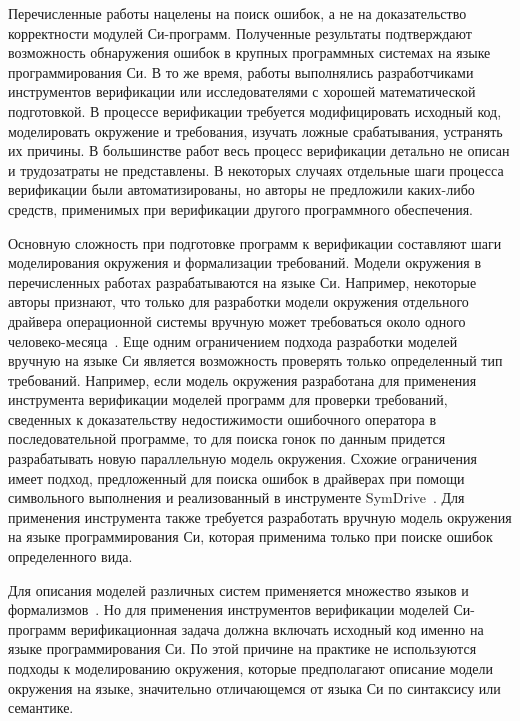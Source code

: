 Перечисленные работы нацелены на поиск ошибок, а не на доказательство корректности модулей Си-программ.
Полученные результаты подтверждают возможность обнаружения ошибок в крупных программных системах на языке программирования Си.
В то же время, работы выполнялись разработчиками инструментов верификации или исследователями с хорошей математической подготовкой.
В процессе верификации требуется модифицировать исходный код, моделировать окружение и требования, изучать ложные срабатывания, устранять их причины.
В большинстве работ весь процесс верификации детально не описан и трудозатраты не представлены.
В некоторых случаях отдельные шаги процесса верификации были автоматизированы, но авторы не предложили каких-либо средств, применимых при верификации другого программного обеспечения.

Основную сложность при подготовке программ к верификации составляют шаги моделирования окружения и формализации требований.
Модели окружения в перечисленных работах разрабатываются на языке Си.
Например, некоторые авторы признают, что только для разработки модели окружения отдельного драйвера операционной системы вручную может требоваться около одного человеко-месяца~\cite{ConcurBugsRakamaric}.
Еще одним ограничением подхода разработки моделей вручную на языке Си является возможность проверять только определенный тип требований.
Например, если модель окружения разработана для применения инструмента верификации моделей программ для проверки требований, сведенных к доказательству недостижимости ошибочного оператора в последовательной программе, то для поиска гонок по данным придется разрабатывать новую параллельную модель окружения.
Схожие ограничения имеет подход, предложенный для поиска ошибок в драйверах при помощи символьного выполнения и реализованный в инструменте SymDrive~\cite{Renzelmann:2012:STD}.
Для применения инструмента также требуется разработать вручную модель окружения на языке программирования Си, которая применима только при поиске ошибок определенного вида.

Для описания моделей различных систем применяется множество языков и формализмов~\cite{Seshia2018}.
Но для применения инструментов верификации моделей Си-программ верификационная задача должна включать исходный код именно на языке программирования Си.
По этой причине на практике не используются подходы к моделированию окружения, которые предполагают описание модели окружения на языке, значительно отличающемся от языка Си по синтаксису или семантике.

